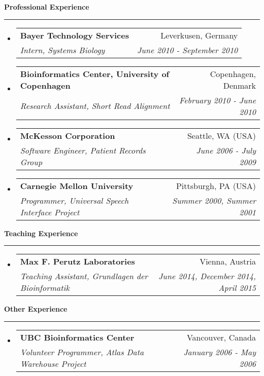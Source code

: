 \documentclass[letterpaper,11pt]{article}
\makeatletter
\newcommand{\resheading}[1]{{\normalsize {\textbf{#1 \vphantom{p\^{E}}}}}}
\newcommand{\ressubheading}[4]{
\begin{tabular*}{6.5in}{l@{\extracolsep{\fill}}r}
		\textbf{#1} & #2 \\
		\textit{#3} & \textit{#4} \\
\end{tabular*}\vspace{-6pt}}
\makeatother
\begin{document}
\resheading{Professional Experience}
\hrule
\begin{itemize}
\item
	\ressubheading{Bayer Technology Services}{Leverkusen, Germany}{Intern, Systems Biology}{June 2010 - September 2010}

	
\item
	\ressubheading{Bioinformatics Center, University of Copenhagen}{Copenhagen, Denmark}{Research Assistant, Short Read Alignment}{February 2010 - June 2010}

\item
	\ressubheading{McKesson Corporation}{Seattle, WA (USA)}{Software Engineer,
          Patient Records Group}{June 2006 - July 2009}
\item
  \ressubheading{Carnegie Mellon University}{Pittsburgh, PA (USA)}{Programmer, Universal Speech Interface Project}{Summer 2000, Summer 2001}
\end{itemize}

\resheading{Teaching Experience}
\hrule
\begin{itemize}
\item
  \ressubheading{Max F. Perutz Laboratories}{Vienna, Austria}{Teaching Assistant,
    Grundlagen der Bioinformatik}{June 2014, December 2014, April 2015}
\end{itemize}

\resheading{Other Experience}
\hrule
\begin{itemize}
\item
  \ressubheading{UBC Bioinformatics Center}{Vancouver, Canada}{Volunteer 
  Programmer,
    Atlas Data Warehouse Project}{January 2006 - May 2006}

\end{itemize}
\end{document}
